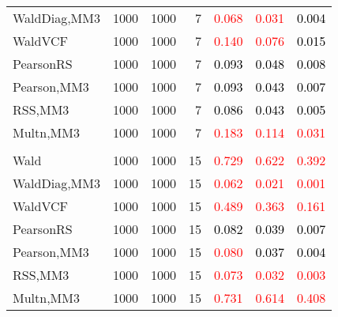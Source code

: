 \documentclass[
]{article}
\begin{document}
\begin{table}[H]
{\begin{tabular}[t]{lrrrrrr}
\hspace{1em}WaldDiag,MM3 & 1000 & 1000 & 7 & \textcolor{red}{0.068} & \textcolor{red}{0.031} & \textcolor{black}{0.004}\\
\hspace{1em}WaldVCF & 1000 & 1000 & 7 & \textcolor{red}{0.140} & \textcolor{red}{0.076} & \textcolor{black}{0.015}\\
\hspace{1em}PearsonRS & 1000 & 1000 & 7 & \textcolor{black}{0.093} & \textcolor{black}{0.048} & \textcolor{black}{0.008}\\
\hspace{1em}Pearson,MM3 & 1000 & 1000 & 7 & \textcolor{black}{0.093} & \textcolor{black}{0.043} & \textcolor{black}{0.007}\\
\hspace{1em}RSS,MM3 & 1000 & 1000 & 7 & \textcolor{black}{0.086} & \textcolor{black}{0.043} & \textcolor{black}{0.005}\\
\hspace{1em}Multn,MM3 & 1000 & 1000 & 7 & \textcolor{red}{0.183} & \textcolor{red}{0.114} & \textcolor{red}{0.031}\\
\addlinespace[0.3em]
\multicolumn{7}{l}{\textbf{1F 15V}}\\
\hspace{1em}Wald & 1000 & 1000 & 15 & \textcolor{red}{0.729} & \textcolor{red}{0.622} & \textcolor{red}{0.392}\\
\hspace{1em}WaldDiag,MM3 & 1000 & 1000 & 15 & \textcolor{red}{0.062} & \textcolor{red}{0.021} & \textcolor{red}{0.001}\\
\hspace{1em}WaldVCF & 1000 & 1000 & 15 & \textcolor{red}{0.489} & \textcolor{red}{0.363} & \textcolor{red}{0.161}\\
\hspace{1em}PearsonRS & 1000 & 1000 & 15 & \textcolor{black}{0.082} & \textcolor{black}{0.039} & \textcolor{black}{0.007}\\
\hspace{1em}Pearson,MM3 & 1000 & 1000 & 15 & \textcolor{red}{0.080} & \textcolor{black}{0.037} & \textcolor{black}{0.004}\\
\hspace{1em}RSS,MM3 & 1000 & 1000 & 15 & \textcolor{red}{0.073} & \textcolor{red}{0.032} & \textcolor{red}{0.003}\\
\hspace{1em}Multn,MM3 & 1000 & 1000 & 15 & \textcolor{red}{0.731} & \textcolor{red}{0.614} & \textcolor{red}{0.408}\\

\end{tabular}}
\end{table}
\end{document}
